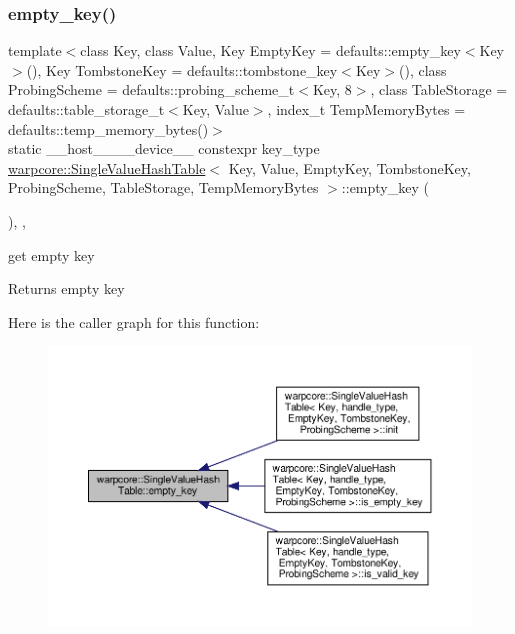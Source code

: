 \subsubsection{\texorpdfstring{empty\+\_\+key()}{empty\_key()}}
{\footnotesize\ttfamily template$<$class Key, class Value, Key Empty\+Key = defaults\+::empty\+\_\+key$<$\+Key$>$(), Key Tombstone\+Key = defaults\+::tombstone\+\_\+key$<$\+Key$>$(), class Probing\+Scheme = defaults\+::probing\+\_\+scheme\+\_\+t$<$\+Key, 8$>$, class Table\+Storage = defaults\+::table\+\_\+storage\+\_\+t$<$\+Key, Value$>$, index\+\_\+t Temp\+Memory\+Bytes = defaults\+::temp\+\_\+memory\+\_\+bytes()$>$ \\
static \+\_\+\+\_\+host\+\_\+\+\_\+\+\_\+\+\_\+device\+\_\+\+\_\+ constexpr key\+\_\+type \hyperlink{classwarpcore_1_1SingleValueHashTable}{warpcore\+::\+Single\+Value\+Hash\+Table}$<$ Key, Value, Empty\+Key, Tombstone\+Key, Probing\+Scheme, Table\+Storage, Temp\+Memory\+Bytes $>$\+::empty\+\_\+key (\begin{DoxyParamCaption}{ }\end{DoxyParamCaption})\hspace{0.3cm}{\ttfamily [inline]}, {\ttfamily [static]}, {\ttfamily [noexcept]}}



get empty key 

\begin{DoxyReturn}{Returns}
empty key 
\end{DoxyReturn}
Here is the caller graph for this function\+:
\nopagebreak
\begin{figure}[H]
\begin{center}
\leavevmode
\includegraphics[width=350pt]{classwarpcore_1_1SingleValueHashTable_add0eb4b5b495e044affce46b8cb11021_icgraph}
\end{center}
\end{figure}
\mbox{\label{classwarpcore_1_1SingleValueHashTable_a93e05fcb58ea20f8e0f12c7ce923bf35}} 
